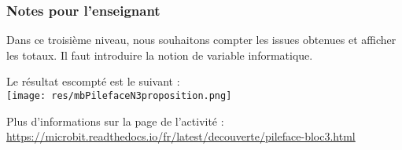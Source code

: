 \newpage
\subsubsection{Notes pour l'enseignant}

Dans ce troisième niveau, nous souhaitons compter les issues obtenues et afficher les totaux. Il faut introduire la notion de variable informatique.

\begin{methode}
Le résultat escompté est le suivant :\\
\texttt{[image: res/mbPilefaceN3proposition.png]}
\end{methode}

\begin{remarque}
Plus d'informations sur la page de l'activité :\\ \url{https://microbit.readthedocs.io/fr/latest/decouverte/pileface-bloc3.html}
\end{remarque}


